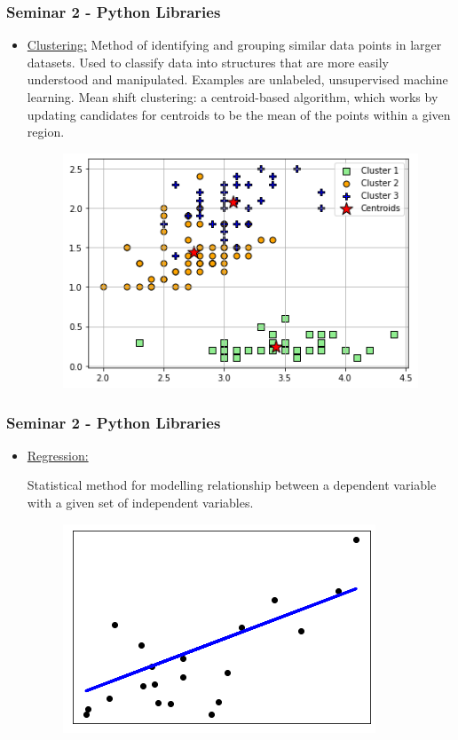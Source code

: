 \documentclass{beamer}
\begin{document}
\begin{frame}[fragile]
\frametitle{Seminar 2 - Python Libraries}
    \begin{itemize}
        \item \underline{Clustering:}\newline
        Method of identifying and grouping similar data points in larger datasets.\newline
        Used to classify data into structures that are more easily understood and manipulated.
        Examples are unlabeled, unsupervised machine learning.
        Mean shift clustering: a centroid-based algorithm, which works by updating candidates for centroids to be the mean of the points within a given region.
         \begin{figure}
         \hspace{1.5cm}\includegraphics[width=0.5\linewidth]{Seminar_2_images/Python/b py 6.png}
       
         \end{figure}
    \end{itemize}
\end{frame}
\begin{frame}[fragile]
\frametitle{Seminar 2 - Python Libraries}
    \begin{itemize}
        \item \underline{Regression:}\newline
        
        Statistical method for modelling relationship between a dependent variable with a given set of independent variables.
        \begin{figure}
        \hspace{1.5cm}\includegraphics[width=0.5\linewidth]{Seminar_2_images/Python/b py 7.png}
       
        \end{figure}
    \end{itemize}
\end{frame}
\end{document}
